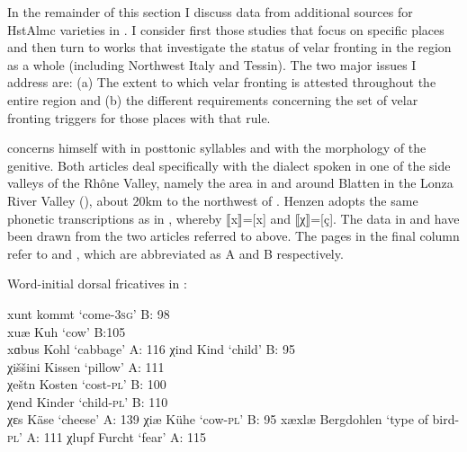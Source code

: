 {In the remainder of this section I discuss data from additional sources for HstAlmc varieties in . I consider first those studies that focus on specific places and then turn to works that investigate the status of velar fronting in the region as a whole (including Northwest Italy and Tessin). The two major issues I address are: (a) The extent to which velar fronting is attested throughout the entire region and (b) the different requirements concerning the set of velar fronting triggers for those places with that rule.

\citet{Henzen1928} concerns himself with  in posttonic syllables and \citet{Henzen1932} with the morphology of the genitive. Both articles deal specifically with the dialect spoken in one of the side valleys of the Rhône Valley, namely the area in and around Blatten in the Lonza River Valley (), about 20km to the northwest of . Henzen adopts the same phonetic transcriptions as in \citet{Wipf1910}, whereby ⟦x⟧=[x] and ⟦χ⟧=[ç]. The data in  and  have been drawn from the two articles referred to above. The pages in the final column refer to \citet{Henzen1928} and \citet{Henzen1932}, which are abbreviated as A and B respectively.\largerpage


\ea%
\label{ex:15:24}Word-initial dorsal fricatives in :

\ea xunt \tab [xunt] \tab kommt \tab ‘come-\textsc{3sg}’ \tab B: 98\\\label{ex:15:24a}
    xuæ \tab [xuæ] \tab Kuh \tab ‘cow’ \tab B:105\\
    xɑbus \tab [xɑbus] \tab Kohl \tab ‘cabbage’ \tab A: 116
\ex χind \tab [çind] \tab Kind \tab ‘child’ \tab B: 95\\\label{ex:15:24b}
    χiššini \tab [çiʃʃini] \tab Kissen \tab ‘pillow’ \tab A: 111\\
    χeštn \tab [çeʃtn̩] \tab Kosten \tab ‘cost-\textsc{pl}’ \tab B: 100\\
    χend \tab [çend] \tab Kinder \tab ‘child-\textsc{pl}’ \tab B: 110\\
    χɛs  \tab  [çɛːs] \tab Käse \tab ‘cheese’ \tab A: 139
\ex  χiæ  \tab  [çiæ] \tab Kühe \tab ‘cow-\textsc{pl}’ \tab B: 95\label{ex:15:24c}
\ex  xæxlæ \tab [xæxlæ] \tab Bergdohlen \tab ‘type of bird-\textsc{pl}’ \tab A: 111\label{ex:15:24d}
\ex  χlupf \tab [çlupf] \tab Furcht \tab ‘fear’ \tab A: 115\label{ex:15:24e}
\z 


}
